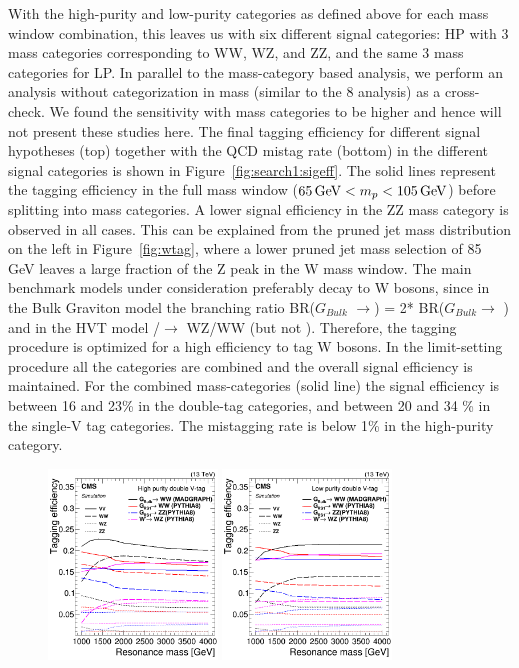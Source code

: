 With the high-purity and low-purity categories as defined above for each mass window combination, this leaves us with six different signal categories:  HP with 3 mass categories corresponding to WW, WZ, and ZZ, and the same 3 mass categories for LP. In parallel to the mass-category based analysis, we perform an analysis without categorization in mass (similar to the 8 \TeV analysis) as a cross-check. We found the sensitivity with mass categories to be higher and hence will not present these studies here. The final tagging efficiency for different signal hypotheses (top) together with the QCD mistag rate (bottom) in the different signal categories is shown in Figure~\ref{fig:search1:sigeff}. The solid lines represent the tagging efficiency in the full mass window ($65 {\,\text{Ge\hspace{-.08em}V}} < m_{p} < 105 {\,\text{Ge\hspace{-.08em}V}}$) before splitting into mass categories. A lower signal efficiency in the ZZ mass category is observed in all cases. This can be explained from the pruned jet mass distribution on the left in Figure~\ref{fig:wtag}, where a lower pruned jet mass selection of 85 GeV leaves a large fraction of the Z peak in the W mass window. The main benchmark models under consideration preferably decay to W bosons, since in the Bulk Graviton model the branching ratio BR($G_{Bulk}$ $\rightarrow$\WW) = 2* BR($G_{Bulk}$$\rightarrow$ \ZZ) and in the HVT model \PWpr/\PZpr$\rightarrow$ WZ/WW (but not \ZZ). Therefore, the tagging procedure is optimized for a high efficiency to tag W bosons. In the limit-setting procedure all the categories are combined and the overall signal efficiency is maintained. For the combined mass-categories (solid line) the signal efficiency is between 16 and 23\% in the double-tag categories, and between 20 and 34 \% in the single-V tag categories. The mistagging rate is below 1\% in the high-purity category.
\begin{figure}[h!]
\centering
\includegraphics[width=0.4\textwidth]{figures/analysis/search1/AN-15-211/HP_VV_SigEff.png}
\includegraphics[width=0.4\textwidth]{figures/analysis/search1/AN-15-211/LP_VV_SigEff.png}\\

\end{figure}$$
